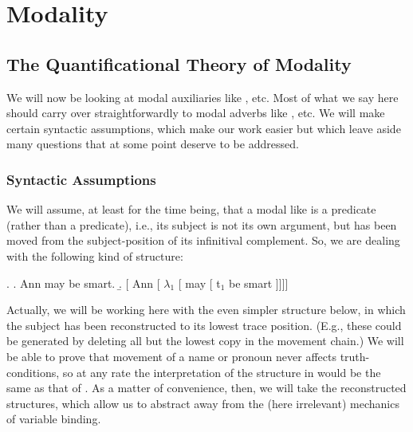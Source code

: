 \newcommand{\exts}[2][w,g]{\ensuremath{\sv{\mbox{#2}}^{#1}}}

\chapter{Modality}\label{cha:modality} %


\minitoc

\section{The Quantificational Theory of Modality} \label{sec:quant-theory-modal}

We will now be looking at modal auxiliaries like , etc. Most of what we say here should carry over straightforwardly to
modal adverbs like , etc. We will make
certain syntactic assumptions, which make our work easier but which leave aside
many questions that at some point deserve to be addressed.

\clearpage
\subsection{Syntactic Assumptions} \label{sec:synt-assumpt-1}

We will assume, at least for the time being, that a modal like 
is a  predicate (rather than a  predicate), i.e.,
its subject is not its own argument, but has been moved from the
subject-position of its infinitival complement. So, we are
dealing with the following kind of structure:

\exi. \a. Ann may be smart. 
\b. [ Ann [ $\lambda_1$ [ may [ t$_1$ be smart ]]]]

Actually, we will be working here with the even simpler structure below, in
which the subject has been reconstructed to its lowest trace position. (E.g.,
these could be generated by deleting all but the lowest copy in the movement
chain.) We will
be able to prove that movement of a name or pronoun never affects
truth-conditions, so at any rate the interpretation of the structure in \Last[b]
would be the same as that of \Next. As a matter of convenience, then, we will
take the reconstructed structures, which allow us to abstract away from the
(here irrelevant) mechanics of variable binding.

